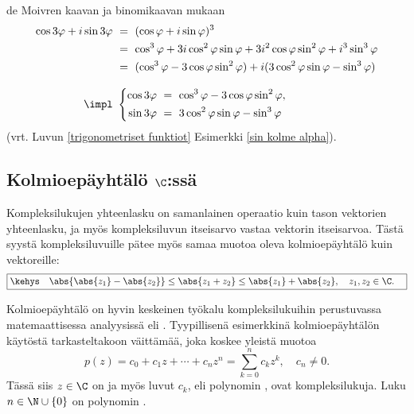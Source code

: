 \begin{Exa} de Moivren kaavan ja binomikaavan mukaan
\begin{align*}
\cos 3 \varphi + i \sin 3 \varphi\ &=\ (\cos \varphi + i \sin \varphi)^3 \\
&=\ \cos^3 \varphi + 3i \cos^2 \varphi \sin \varphi + 3 i^2 \cos \varphi \sin^2 \varphi 
                                                    +i^3 \sin^3 \varphi \\
&=\ (\cos^3 \varphi - 3\cos \varphi \sin^2 \varphi) + i(3 \cos^2 \varphi \sin \varphi 
                                                    - \sin^3 \varphi) \\[3mm]
\impl \ &\left\{
\begin{aligned}
\cos 3 \varphi\ &=\ \cos^3 \varphi - 3 \cos \varphi \sin^2 \varphi, \\
\sin 3 \varphi\ &=\ 3 \cos^2 \varphi \sin \varphi - \sin^3 \varphi
\end{aligned} \right.
\end{align*}
(vrt. Luvun \ref{trigonometriset funktiot} Esimerkki \ref{sin kolme alpha}). \loppu
\end{Exa}

\subsection{Kolmioepäyhtälö $\C$:ssä}

Kompleksilukujen yhteenlasku on samanlainen operaatio kuin tason vektorien yhteenlasku, ja
myös kompleksiluvun itseisarvo vastaa vektorin itseisarvoa. Tästä syystä kompleksiluvuille
pätee myös samaa muotoa oleva kolmioepäyhtälö kuin vektoreille:
\[
\boxed{\kehys\quad \abs{\abs{z_1}-\abs{z_2}} \le \abs{z_1 + z_2} \leq \abs{z_1} + \abs{z_2}, 
                                                                 \quad z_1,z_2 \in \C. \quad}
\]

Kolmioepäyhtälö on hyvin keskeinen työkalu kompleksilukuihin perustuvassa matemaattisessa
analyysissä eli . Tyypillisenä esimerkkinä kolmioepäyhtälön käytöstä 
tarkasteltakoon väittämää, joka koskee yleistä
 muotoa
\[
p(z) = c_0 + c_1z + \cdots + c_nz^n = \sum_{k=0}^{n} c_k z^k, \quad c_n \neq 0. 
\]
Tässä siis $z \in \C$ on  ja myös luvut $c_k$, eli polynomin
, ovat kompleksilukuja. Luku $n\in\N\cup\{0\}$ on polynomin .

